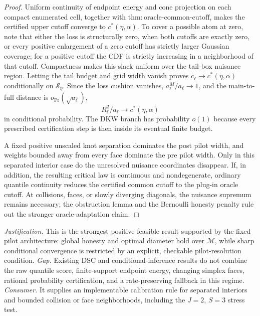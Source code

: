 \documentclass{article}
\begin{document}
\begin{proof}
Uniform continuity of endpoint energy and cone projection on each compact enumerated cell, together with
\(\mathrm{thm:oracle\mbox{-}common\mbox{-}cutoff}\), makes the certified upper cutoff converge to \(c^*(\eta,\alpha)\).  To cover a possible atom at zero, note that either the loss is structurally zero, when both cutoffs are exactly zero, or every positive enlargement of a zero cutoff has strictly larger Gaussian coverage; for a positive cutoff the CDF is strictly increasing in a neighborhood of that cutoff.  Compactness makes this slack uniform over the tail-box nuisance region.  Letting the tail budget and grid width vanish proves
\(\overline c_\ell\to c^*(\eta,\alpha)\) conditionally on \(\mathscr S_\eta\).  Since the loss cushion vanishes, \(a^M_\ell/a_\ell\to1\), and the main-to-full distance is \(o_{\Pr}(\sqrt{a_\ell})\),
\[
 R_\ell^2/a_\ell\longrightarrow c^*(\eta,\alpha)
\]
in conditional probability.  The DKW branch has probability \(o(1)\) because every prescribed certification step is then inside its eventual finite budget.

A fixed positive unscaled knot separation dominates the post pilot width, and weights bounded away from every face dominate the pre pilot width.  Only in this separated interior case do the unresolved nuisance coordinates disappear.  If, in addition, the resulting critical law is continuous and nondegenerate, ordinary quantile continuity reduces the certified common cutoff to the plug-in oracle cutoff.  At collisions, faces, or slowly diverging diagonals, the nuisance supremum remains necessary; the obstruction lemma and the Bernoulli honesty penalty rule out the stronger oracle-adaptation claim.
\end{proof}
\par\smallskip\noindent \textit{Justification.} This is the strongest positive feasible result supported by the fixed pilot architecture: global honesty and optimal diameter hold over \(\mathcal M\), while sharp conditional convergence is restricted by an explicit, checkable pilot-resolution condition. \textit{Gap.} Existing DSC and conditional-inference results do not combine the raw quantile score, finite-support endpoint energy, changing simplex faces, rational probability certification, and a rate-preserving fallback in this regime. \textit{Consumer.} It supplies an implementable calibration rule for separated interiors and bounded collision or face neighborhoods, including the \(J=2\), \(S=3\) stress test.
\end{document}
